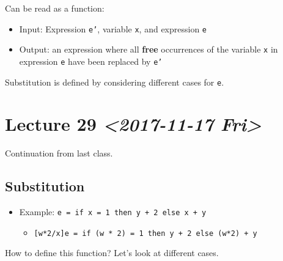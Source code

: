 \documentclass[11pt]{article}
\begin{document}
Can be read as a function:
\begin{itemize}
\item Input: Expression \texttt{e'}, variable \texttt{x}, and expression \texttt{e}
\item Output: an expression where all \textbf{free} occurrences of the variable \texttt{x} in expression \texttt{e} have been replaced by \texttt{e'}
\end{itemize}
Substitution is defined by considering different cases for \texttt{e}.
\section{Lecture 29 \textit{<2017-11-17 Fri>}}
\label{sec:org5e4ca8e}
Continuation from last class.
\subsection{Substitution}
\label{sec:orgb685c02}
\begin{itemize}
\item Example: \texttt{e = if x = 1 then y + 2 else x + y}
\begin{itemize}
\item \texttt{[w*2/x]e = if (w * 2) = 1 then y + 2 else (w*2) + y}
\end{itemize}
\end{itemize}
How to define this function? Let's look at different cases.
\end{document}
